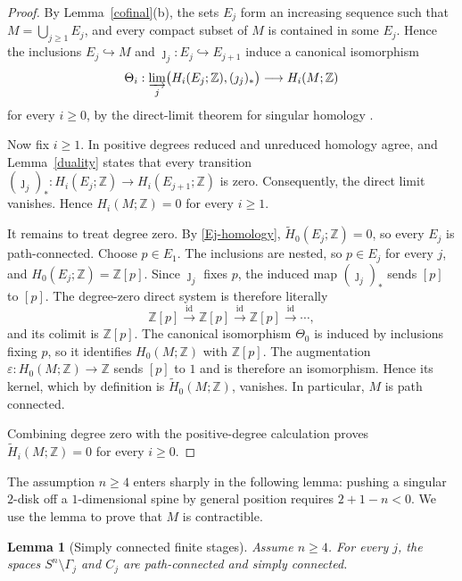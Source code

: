 \documentclass[12pt,oneside,a4paper]{article}
\theoremstyle{mytheorem}
\newtheorem{lemma}[definition]{Lemma}
\theoremstyle{remark}
\theoremstyle{definition}
\begin{document}
\begin{proof}
By Lemma~\ref{cofinal}(b), the sets $E_j$ form an
increasing sequence such that $M=\bigcup_{j\geq1}E_j$,
and every compact subset of $M$ is contained in some $E_j$.  Hence the
inclusions $E_j\hookrightarrow M$ and
$\jmath_j:E_j\hookrightarrow E_{j+1}$ induce a canonical isomorphism
\begin{equation*}
\Theta_i:
\varinjlim_j
\bigl(H_i(E_j;\mathbb Z),(\jmath_j)_*\bigr)
\longrightarrow
H_i(M;\mathbb Z)
\end{equation*}
for every $i\geq0$, by the direct-limit theorem for singular homology
\cite[Proposition~3.33]{zbMATH02103273}.


Now fix $i\geq1$.  In positive degrees reduced and unreduced homology
agree, and Lemma~\ref{duality} states that every transition
$(\jmath_j)_*: H_i(E_j;\mathbb Z)\to H_i(E_{j+1};\mathbb Z)$
is zero.  Consequently, the direct limit vanishes.  Hence
$H_i(M;\mathbb Z)=0$ for every $i\geq1$.

It remains to treat degree zero.  By \eqref{Ej-homology},
$\widetilde H_0(E_j;\mathbb Z)=0$, so every $E_j$ is path-connected.
Choose $p\in E_1$.  The inclusions are nested, so $p\in E_j$ for every
$j$, and $H_0(E_j;\mathbb Z)=\mathbb Z[p]$.
Since $\jmath_j$ fixes $p$, the induced map $(\jmath_j)_*$ sends $[p]$
to $[p]$.  The degree-zero direct system is therefore literally
\[
\mathbb Z[p]\xrightarrow{\mathrm{id}}\mathbb Z[p]
\xrightarrow{\mathrm{id}}\mathbb Z[p]
\xrightarrow{\mathrm{id}}\cdots,
\]
and its colimit is $\mathbb Z[p]$.  The canonical isomorphism $\Theta_0$
is induced by inclusions fixing $p$, so it identifies
$H_0(M;\mathbb Z)$ with $\mathbb Z[p]$.  The
augmentation $\varepsilon:H_0(M;\mathbb Z)\to\mathbb Z$
sends $[p]$ to $1$ and is therefore an isomorphism.  Hence its kernel,
which by definition is $\widetilde H_0(M;\mathbb Z)$, vanishes.  In
particular, $M$ is path connected.

Combining degree zero with the positive-degree calculation proves
$\widetilde H_i(M;\mathbb Z)=0$
for every $i\geq0$.

\end{proof}


The assumption $n\geq4$ enters sharply in the following lemma: pushing
a singular $2$-disk off a $1$-dimensional spine by
general position requires $2+1-n<0$.  We use the lemma to prove that
$M$ is contractible.


\begin{lemma}[Simply connected finite stages]\label{lem:sc}
Assume $n\geq4$.  For every $j$, the spaces
$S^n\setminus\Gamma_j$ and $C_j$ are path-connected and
simply connected.
\end{lemma}
\end{document}
